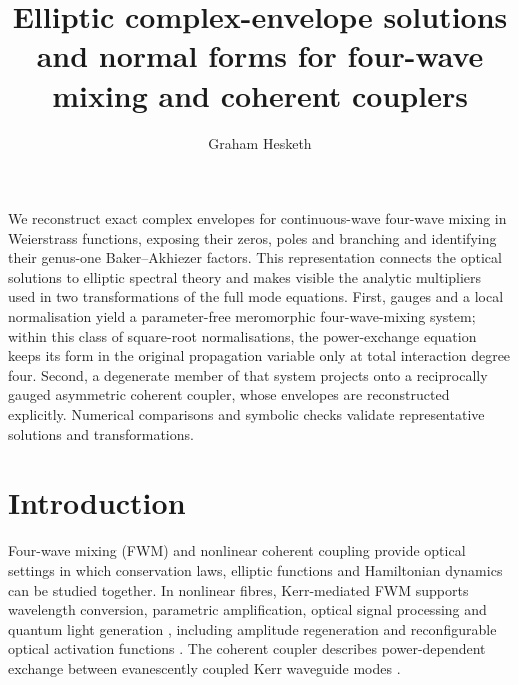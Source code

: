 \documentclass{optica-article}
\numberwithin{equation}{section}
\begin{document}
\title{Elliptic complex-envelope solutions and normal forms for four-wave mixing and coherent couplers}
\author{Graham Hesketh\authormark{*}}
\address{Independent researcher, United Kingdom}
\begin{abstract*}
We reconstruct exact complex envelopes for continuous-wave four-wave mixing in Weierstrass functions, exposing their zeros, poles and branching and identifying their genus-one Baker--Akhiezer factors.
This representation connects the optical solutions to elliptic spectral theory and makes visible the analytic multipliers used in two transformations of the full mode equations.
First, gauges and a local normalisation yield a parameter-free meromorphic four-wave-mixing system; within this class of square-root normalisations, the power-exchange equation keeps its form in the original propagation variable only at total interaction degree four.
Second, a degenerate member of that system projects onto a reciprocally gauged asymmetric coherent coupler, whose envelopes are reconstructed explicitly.
Numerical comparisons and symbolic checks validate representative solutions and transformations.
\end{abstract*}

\section{Introduction}
Four-wave mixing (FWM) and nonlinear coherent coupling provide optical settings in which conservation laws, elliptic functions and Hamiltonian dynamics can be studied together.
In nonlinear fibres, Kerr-mediated FWM supports wavelength conversion, parametric amplification, optical signal processing and quantum light generation \cite{agrawalNonlinearFiberOptics2019,marhicFiberOpticalParametric2007}, including amplitude regeneration \cite{bottrillOptimisationAmplitudeLimiters2016} and reconfigurable optical activation functions \cite{yangReconfigurableOpticalNonlinear2026}.
The coherent coupler describes power-dependent exchange between evanescently coupled Kerr waveguide modes \cite{jensenNonlinearCoherentCoupler1982}.
\end{document}
